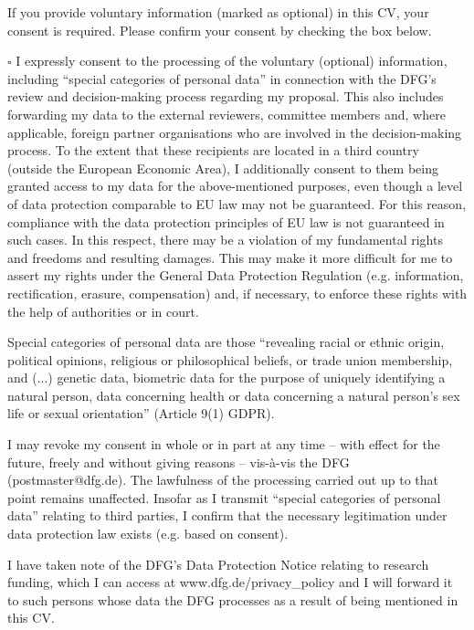 {\small
If you provide voluntary information (marked as optional) in this CV, your consent is required. Please confirm your consent by checking the box below. 

$\square$ I expressly consent to the processing of the voluntary (optional) information, including “special categories of personal data” in connection with the DFG’s review and decision-making process regarding my proposal. This also includes forwarding my data to the external reviewers, committee members and, where applicable, foreign partner organisations who are involved in the decision-making process. To the extent that these recipients are located in a third country (outside the European Economic Area), I additionally consent to them being granted access to my data for the above-mentioned purposes, even though a level of data protection comparable to EU law may not be guaranteed. For this reason, compliance with the data protection principles of EU law is not guaranteed in such cases. In this respect, there may be a violation of my fundamental rights and freedoms and resulting damages. This may make it more difficult for me to assert my rights under the General Data Protection Regulation (e.g. information, rectification, erasure, compensation) and, if necessary, to enforce these rights with the help of authorities or in court.

Special categories of personal data are those “revealing racial or ethnic origin, political opinions, religious or philosophical beliefs, or trade union membership, and (...) genetic data, biometric data for the purpose of uniquely identifying a natural person, data concerning health or data concerning a natural person’s sex life or sexual orientation” (Article 9(1) GDPR).

I may revoke my consent in whole or in part at any time – with effect for the future, freely and without giving reasons – vis-à-vis the DFG (postmaster@dfg.de). The lawfulness of the processing carried out up to that point remains unaffected. Insofar as I transmit “special categories of personal data” relating to third parties, I confirm that the necessary legitimation under data protection law exists (e.g. based on consent).

I have taken note of the DFG’s Data Protection Notice relating to research funding, which I can access at www.dfg.de/privacy\_policy and I will forward it to such persons whose data the DFG processes as a result of being mentioned in this CV.
}

